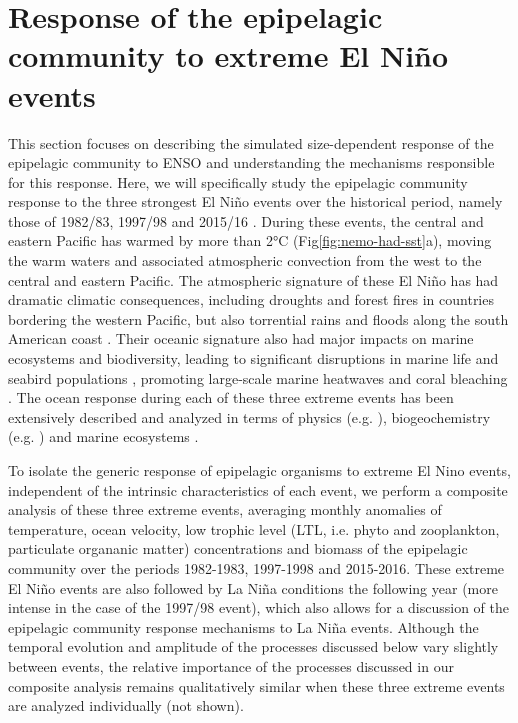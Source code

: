 
\section{Response of the epipelagic community to extreme El Niño events}
\label{sec:nino-epi}

This section focuses on describing the simulated size-dependent response of the epipelagic community to ENSO and understanding the mechanisms responsible for this response. Here, we will specifically study the epipelagic community response to the three strongest El Niño events over the historical period, namely those of 1982/83, 1997/98 and 2015/16 \citep{santosoDefiningCharacteristicsENSO2017}. During these events, the central and eastern Pacific has warmed by more than 2°C (Fig\ref{fig:nemo-had-sst}a), moving the warm waters and associated atmospheric convection from the west to the central and eastern Pacific. The atmospheric signature of these El Niño has had dramatic climatic consequences, including droughts and forest fires in countries bordering the western Pacific, but also torrential rains and floods along the south American coast \citep{caiClimateImpactsNino2020}. Their oceanic signature also had major impacts on marine ecosystems and biodiversity, leading to significant disruptions in marine life and seabird populations \citep{valleImpact198219831987}, promoting large-scale marine heatwaves \citep{holbrookKeepingPaceMarine2020} and coral bleaching \citep{claarGlobalPatternsImpacts2018}.  The ocean response during each of these three extreme events has been extensively described and analyzed in terms of physics (e.g. \citealp{philanderChapter33Simulation1985, lengaigneOceanResponseMarch2002, puyModulationEquatorialPacific2019}), biogeochemistry (e.g. \citealp{barberBiologicalConsequencesNino1983, chavezBiologicalChemicalResponse1999, strammaObservedNinoConditions2016}) and marine ecosystems \citep{glynnNINOSOUTHERNOSCILLATION198219831988, glynnCoralBleachingMortality2001, eakin20142017Globalscale2019}. 

To isolate the generic response of epipelagic organisms to extreme El Nino events, independent of the intrinsic characteristics of each event, we perform a composite analysis of these three extreme events, averaging monthly anomalies of temperature, ocean velocity, low trophic level  (LTL, i.e. phyto and zooplankton, particulate organanic matter) concentrations and biomass of the epipelagic community over the periods 1982-1983, 1997-1998 and 2015-2016. These extreme El Niño events are also followed by La Niña conditions the following year (more intense in the case of the 1997/98 event), which also allows for a discussion  of the epipelagic community response mechanisms to La Niña events. Although the temporal evolution and amplitude of the processes discussed below vary slightly between events, the relative importance of the processes discussed in our composite analysis remains qualitatively similar when these three extreme events are analyzed individually (not shown). 


